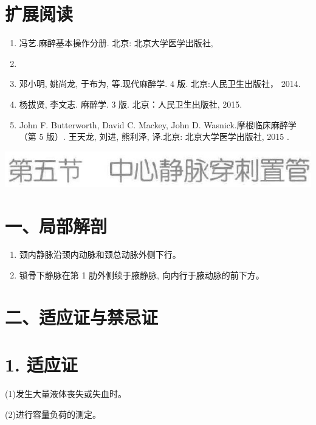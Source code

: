 \documentclass[10pt]{article}
\begin{document}
\section*{扩展阅读}
\begin{enumerate}
  \item 冯艺.麻醉基本操作分册. 北京: 北京大学医学出版社,

  \item 
  \item 邓小明, 姚尚龙, 于布为, 等.现代麻醉学. 4 版. 北京:人民卫生出版社， 2014.

  \item 杨拔贤, 李文志. 麻醉学. 3 版. 北京：人民卫生出版社, 2015.

  \item John F. Butterworth, David C. Mackey, John D. Wasnick.摩根临床麻醉学（第 5 版）. 王天龙, 刘进, 熊利泽, 译.北京: 北京大学医学出版社, 2015 .

\end{enumerate}

\begin{center}
\includegraphics[max width=\textwidth]{2024_07_05_645bb794a4d4f32ee0c8g-301}
\end{center}

\section*{一、局部解剖}
\begin{enumerate}
  \item 颈内静脉沿颈内动脉和颈总动脉外侧下行。

  \item 锁骨下静脉在第 1 肋外侧续于腋静脉, 向内行于腋动脉的前下方。

\end{enumerate}

\section*{二、适应证与禁忌证}
\section*{1. 适应证}
(1)发生大量液体丧失或失血时。

(2)进行容量负荷的测定。
\end{document}
